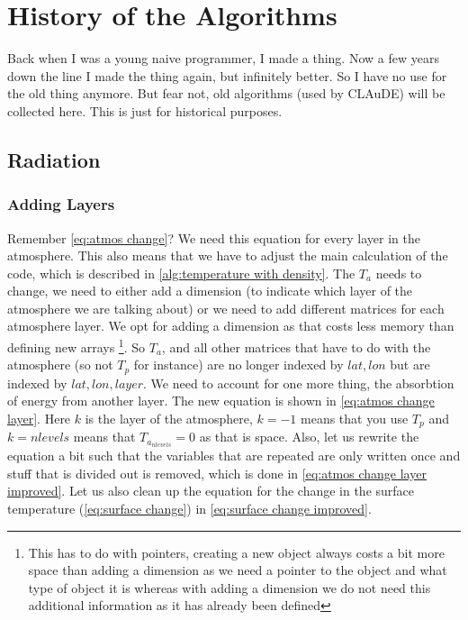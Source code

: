 \section{History of the Algorithms} \label{sec:history}
Back when I was a young naive programmer, I made a thing. Now a few years down the line I made the thing again, but infinitely better. So I have no use for the old thing anymore. But fear not,
old algorithms (used by CLAuDE) will be collected here. This is just for historical purposes.

\subsection{Radiation}
\subsubsection{Adding Layers}
Remember \autoref{eq:atmos change}? We need this equation for every layer in the atmosphere. This also means that we have to adjust the main calculation of the code, which is described  in 
\autoref{alg:temperature with density}. The $T_a$ needs to change, we need to either add a dimension (to indicate which layer of the atmosphere we are talking about) or we need to add different
matrices for each atmosphere layer. We opt for adding a dimension as that costs less memory than defining new arrays 
\footnote{This has to do with pointers, creating a new object always costs a bit more space than adding a dimension as we need a pointer to the object and what type of object it is whereas with 
adding a dimension we do not need this additional information as it has already been defined}. So $T_a$, and all other matrices that have to do with the atmosphere (so not $T_p$ for instance) 
are no longer indexed by $lat, lon$ but are indexed by $lat, lon, layer$. We need to account for one more thing, the absorbtion of energy from another layer. The new equation is shown in 
\autoref{eq:atmos change layer}. Here $k$ is the layer of the atmosphere, $k = -1$ means that you use $T_p$ and $k = nlevels$ means that $T_{a_{nlevels}} = 0$ as that is space. Also, let us
rewrite the equation a bit such that the variables that are repeated are only written once and stuff that is divided out is removed, which is done in \autoref{eq:atmos change layer improved}.
Let us also clean up the equation for the change in the surface temperature (\autoref{eq:surface change}) in \autoref{eq:surface change improved}.

